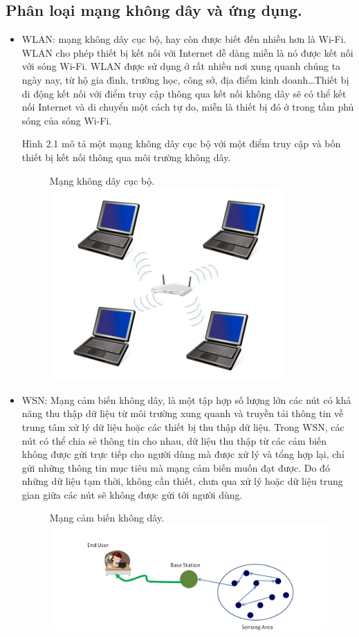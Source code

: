 \documentclass{uetgraduation}
\begin{document}
\subsection{Phân loại mạng không dây và ứng dụng.}
\begin{itemize}
    \item WLAN: mạng không dây cục bộ, hay còn được biết đến nhiều hơn là Wi-Fi. WLAN cho phép thiết bị kết nối với Internet dễ dàng miễn là nó được kết nối với
    sóng Wi-Fi. WLAN được sử dụng ở rất nhiều nơi xung quanh chúng ta ngày nay, từ hộ gia đình, trường học, công sở, địa điểm kinh doanh\dots Thiết bị di động
    kết nối với điểm truy cập thông qua kết nối không dây sẽ có thể kết nối Internet và di chuyển một cách tự do, miễn là thiết bị đó ở trong tầm phủ sóng của
    sóng Wi-Fi.

    Hình 2.1 mô tả một mạng không dây cục bộ với một điểm truy cập và bốn thiết bị kết nối thông qua môi trường không dây.
    \begin{figure}{Mạng không dây cục bộ.}
        \centering
        \includegraphics[scale=0.6]{wlan}
        \label{fig:wlan}
    \end{figure}
    \item WSN: Mạng cảm biến không dây, là một tập hợp số lượng lớn các nút có khả năng thu thập dữ liệu từ môi trường xung quanh và truyền tải thông tin
    về trung tâm xử lý dữ liệu hoặc các thiết bị thu thập dữ liệu. Trong WSN, các nút có thể chia sẻ thông tin cho nhau, dữ liệu thu thập từ các cảm biến không được
    gửi trực tiếp cho người dùng mà được xử lý và tổng hợp lại, chỉ gửi những thông tin mục tiêu mà mạng cảm biến muốn đạt được. Do đó những dữ liệu tạm thời, không
    cần thiết, chưa qua xử lý hoặc dữ liệu trung gian giữa các nút sẽ không được gửi tới người dùng.
    \begin{figure}{Mạng cảm biến không dây.}
        \centering
        \includegraphics[scale=0.6]{wsn}
        \label{fig:wsn}
    \end{figure}


\end{itemize}
\end{document}
